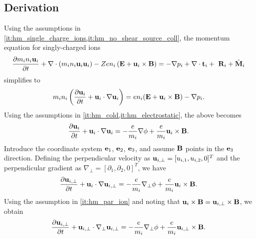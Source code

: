 \documentclass[11pt]{article}
\begin{document}
\subsection{Derivation}
Using the assumptions in \cref{it:hm_single_charge_ions,it:hm_no_shear_source_coll}, the momentum equation for singly-charged ions
\begin{equation}
    \frac{\partial m_i n_i \mathbf{u}_i}{\partial t} + \nabla \cdot \left ( m_i n_i \mathbf{u}_i \mathbf{u}_i \right ) - Z e n_i \left ( \mathbf{E} + \mathbf{u}_i \times \mathbf{B} \right ) = -\nabla p_i + \nabla \cdot \mathbf{t}_i + \ \mathbf{R}_i + \hat{\mathbf{M}}_i
\end{equation}
simplifies to
\begin{equation}
    m_i n_i \left (\frac{\partial \mathbf{u}_i}{\partial t} + \mathbf{u}_i \cdot \nabla \mathbf{u}_i \right ) = e n_i (\mathbf{E} + \mathbf{u}_i \times \mathbf{B}) - \nabla p_i.
\end{equation}
Using the assumptions in \cref{it:hm_cold,it:hm_electrostatic}, the above becomes
\begin{equation}
    \frac{\partial \mathbf{u}_i}{\partial t} + \mathbf{u}_i \cdot \nabla \mathbf{u}_i = -\frac{e}{m_i} \nabla \phi + \frac{e}{m_i}\mathbf{u}_i \times \mathbf{B}.
\end{equation}
Introduce the coordinate system $\mathbf{e}_1$, $\mathbf{e}_2$, $\mathbf{e}_3$, and assume $\mathbf{B}$ points in the $\mathbf{e}_3$ direction. Defining the perpendicular velocity as $\mathbf{u}_{i,\perp} = [u_{i,1}, u_{i,2}, 0]^T$ and the perpendicular gradient as $\nabla_\perp = [\partial_1, \partial_2, 0]^T$, we have
\begin{equation}
    \frac{\partial \mathbf{u}_{i,\perp}}{\partial t} + \mathbf{u}_i \cdot \nabla \mathbf{u}_{i,\perp} = -\frac{e}{m_i} \nabla_\perp \phi + \frac{e}{m_i}\mathbf{u}_i \times \mathbf{B}.
\end{equation}
Using the assumption in \cref{it:hm_par_ion} and noting that $\mathbf{u}_{i} \times \mathbf{B} = \mathbf{u}_{i,\perp} \times \mathbf{B}$, we obtain
\begin{equation}
\label{eq:hm_momentum_perpendicular}
    \frac{\partial \mathbf{u}_{i,\perp}}{\partial t} + \mathbf{u}_{i,\perp} \cdot \nabla_\perp \mathbf{u}_{i,\perp} = -\frac{e}{m_i} \nabla_\perp \phi + \frac{e}{m_i} \mathbf{u}_{i,\perp} \times \mathbf{B}.
\end{equation}
\end{document}
